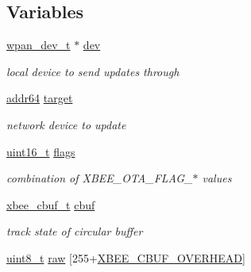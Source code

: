 \subsection*{Variables}
\begin{DoxyCompactItemize}
\item 
\mbox{\label{group__xbee__ota__client_gaa7262b389539547f7405189cd4bf274c}} 
\hyperlink{structwpan__dev__t}{wpan\+\_\+dev\+\_\+t} $\ast$ \hyperlink{group__xbee__ota__client_gaa7262b389539547f7405189cd4bf274c}{dev}
\begin{DoxyCompactList}\small\item\em local device to send updates through \end{DoxyCompactList}\item 
\mbox{\label{group__xbee__ota__client_gaef649f9dfe9109ac17db3fda73c61036}} 
\hyperlink{unionaddr64}{addr64} \hyperlink{group__xbee__ota__client_gaef649f9dfe9109ac17db3fda73c61036}{target}
\begin{DoxyCompactList}\small\item\em network device to update \end{DoxyCompactList}\item 
\mbox{\label{group__xbee__ota__client_ga1e87af3c18a2fd36c61faf89949bdc3f}} 
\hyperlink{group__hal__dos_ga5a8b2dc9e45a9ee81a94ef304fb62505}{uint16\+\_\+t} \hyperlink{group__xbee__ota__client_ga1e87af3c18a2fd36c61faf89949bdc3f}{flags}
\begin{DoxyCompactList}\small\item\em combination of X\+B\+E\+E\+\_\+\+O\+T\+A\+\_\+\+F\+L\+A\+G\+\_\+$\ast$ values \end{DoxyCompactList}\item 
\hyperlink{structxbee__cbuf__t}{xbee\+\_\+cbuf\+\_\+t} \hyperlink{group__xbee__ota__client_gaa86751bccf68cd96c559cd1947e455c9}{cbuf}
\begin{DoxyCompactList}\small\item\em track state of circular buffer \end{DoxyCompactList}\item 
\hyperlink{group__hal__dos_gae1affc9ca37cfb624959c866a73f83c2}{uint8\+\_\+t} \hyperlink{group__xbee__ota__client_gafaab4db801ec47fb901e28ee4c4eac04}{raw} \mbox{[}255+\hyperlink{group__util__cbuf_ga6fb73f000c9aa3d2b26f3ae089676bfa}{X\+B\+E\+E\+\_\+\+C\+B\+U\+F\+\_\+\+O\+V\+E\+R\+H\+E\+AD}\mbox{]}

\end{DoxyCompactItemize}
